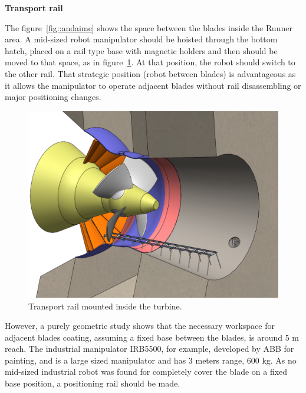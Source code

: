 \textbf{Transport rail}

The figure~\ref{fig::andaime} shows the space between the blades inside the
Runner area. A mid-sized robot manipulator should be hoisted through the bottom
hatch, placed on a rail type base with magnetic holders and then should be moved
to that space, as in figure~\ref{fig::rail1}. At that position, the robot should
switch to the other rail. That strategic position (robot between blades) is
advantageous as it allows the manipulator to operate adjacent blades without
rail disassembling or major positioning changes.

\begin{figure}[h!]	
	\includegraphics[width=\columnwidth]{figs/manipuladores/rail1.PNG}
	\caption{Transport rail mounted inside the turbine.}
	\label{fig::rail1}
\end{figure}


However, a purely geometric study shows that the necessary workspace for
adjacent blades coating, assuming a fixed base between the blades,
is around 5 m reach. The industrial manipulator IRB5500, for example, developed
by ABB for painting, and is a large sized manipulator and has 3 meters range,
600 kg.
As no mid-sized industrial robot was found for completely cover
the blade on a fixed base position, a positioning rail should be made.

